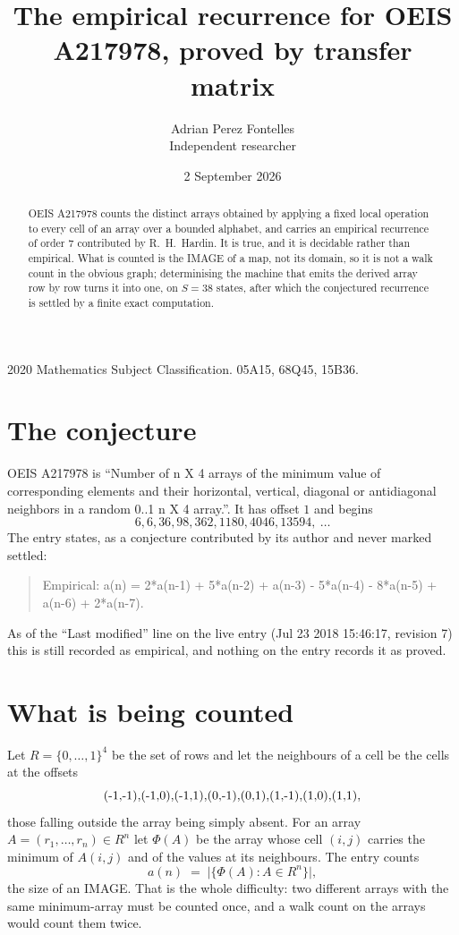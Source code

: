 \documentclass[11pt,a4paper]{article}
\title{The empirical recurrence for OEIS A217978, proved by transfer matrix}
\author{Adrian Perez Fontelles\\ \small Independent researcher}
\date{2 September 2026}
\theoremstyle{plain}
\theoremstyle{definition}
\begin{document}
\maketitle

\begin{abstract}
OEIS A217978 counts the distinct arrays obtained by applying a fixed local operation to every cell
of an array over a bounded alphabet, and carries an empirical recurrence of order $7$
contributed by R.~H.~Hardin. It is true, and it is decidable rather than empirical. What is
counted is the IMAGE of a map, not its domain, so it is not a walk count in the obvious graph;
determinising the machine that emits the derived array row by row turns it into one, on
$S=38$ states, after which the conjectured recurrence is settled by a finite exact
computation.
\end{abstract}

\noindent\small 2020 Mathematics Subject Classification. 05A15, 68Q45, 15B36.\normalsize

\section{The conjecture}

OEIS A217978 is ``Number of n X 4 arrays of the minimum value of corresponding elements and their horizontal, vertical, diagonal or antidiagonal neighbors in a random 0..1 n X 4 array.''. It has offset $1$ and begins
\[
6, 6, 36, 98, 362, 1180, 4046, 13594,\ \dots
\]
The entry states, as a conjecture contributed by its author and never marked settled:
\begin{quote}
Empirical: a(n) = 2*a(n-1) + 5*a(n-2) + a(n-3) - 5*a(n-4) - 8*a(n-5) + a(n-6) + 2*a(n-7).
\end{quote}
As of the ``Last modified'' line on the live entry (Jul 23 2018 15:46:17, revision 7) this is still
recorded as empirical, and nothing on the entry records it as proved.

\section{What is being counted}

Let $R=\{0,\dots,1\}^{4}$ be the set of rows and let the neighbours of
a cell be the cells at the offsets
\[
$(-1,-1)$, $(-1,0)$, $(-1,1)$, $(0,-1)$, $(0,1)$, $(1,-1)$, $(1,0)$, $(1,1)$,
\]
those falling outside the array being simply absent. For an array
$A=(r_1,\dots,r_n)\in R^n$ let $\Phi(A)$ be the array whose cell $(i,j)$ carries the
minimum of $A(i,j)$ and of the values at its neighbours. The entry counts
\[
a(n)\;=\;\bigl|\{\Phi(A):A\in R^n\}\bigr| ,
\]
the size of an IMAGE. That is the whole difficulty: two different arrays with the same
minimum-array must be counted once, and a walk count on the arrays would count them twice.
\end{document}
